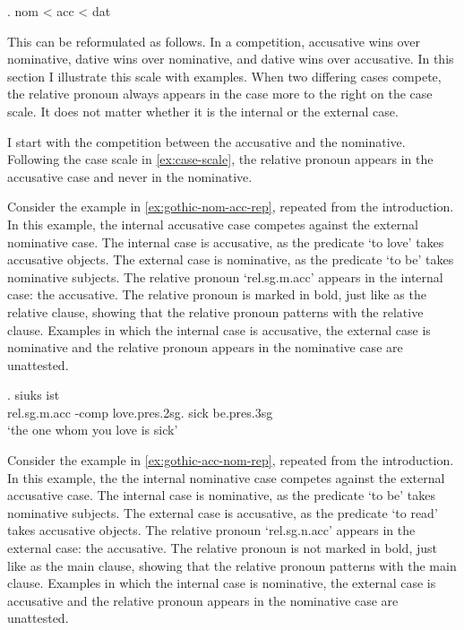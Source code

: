\ex. \ac{nom} < \ac{acc} < \ac{dat}\label{ex:case-scale}

This can be reformulated as follows. In a competition, accusative wins over nominative, dative wins over nominative, and dative wins over accusative. In this section I illustrate this scale with examples. When two differing cases compete, the relative pronoun always appears in the case more to the right on the case scale. It does not matter whether it is the internal or the external case.

I start with the competition between the accusative and the nominative. Following the case scale in \ref{ex:case-scale}, the relative pronoun appears in the accusative case and never in the nominative.

Consider the example in \ref{ex:gothic-nom-acc-rep}, repeated from the introduction. In this example, the internal accusative case competes against the external nominative case.
The internal case is accusative, as the predicate  `to love' takes accusative objects.
The external case is nominative, as the predicate  `to be' takes nominative subjects.
The relative pronoun  `\ac{rel}.\ac{sg}.\ac{m}.\ac{acc}' appears in the internal case: the accusative. The relative pronoun is marked in bold, just like as the relative clause, showing that the relative pronoun patterns with the relative clause.
Examples in which the internal case is accusative, the external case is nominative and the relative pronoun appears in the nominative case are unattested.

\exg.    siuks ist\\
 \ac{rel}.\ac{sg}.\ac{m}.\ac{acc} -\ac{comp} love.\ac{pres}.2\ac{sg}.\scsub{[acc]} sick be.\ac{pres}.3\ac{sg}\scsub{[nom]}\\
 `the one whom you love is sick' \label{ex:gothic-nom-acc-rep}

Consider the example in \ref{ex:gothic-acc-nom-rep}, repeated from the introduction. In this example, the the internal nominative case competes against the external accusative case.
The internal case is nominative, as the predicate  `to be' takes nominative subjects.
The external case is accusative, as the predicate  `to read' takes accusative objects.
The relative pronoun  `\ac{rel}.\ac{sg}.\ac{n}.\ac{acc}' appears in the external case: the accusative. The relative pronoun is not marked in bold, just like as the main clause, showing that the relative pronoun patterns with the main clause.
Examples in which the internal case is nominative, the external case is accusative and the relative pronoun appears in the nominative case are unattested.

